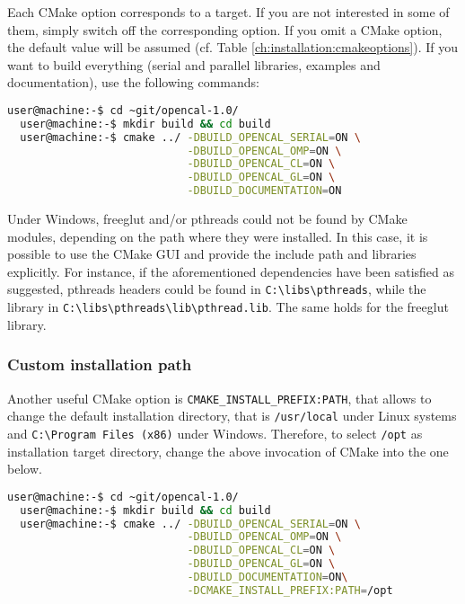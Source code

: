 Each CMake option corresponds to a target. If you are not interested
in some of them, simply switch off the corresponding option. If you
omit a CMake option, the default value will be assumed (cf. Table
\ref{ch:installation:cmakeoptions}). If you want to build everything
(serial and parallel libraries, examples and documentation), use the
following commands:

\begin{lstlisting}[numbers=none,language=bash,label={ch:quickstart:simplebuild}]
  user@machine:-$ cd ~git/opencal-1.0/
  user@machine:-$ mkdir build && cd build
  user@machine:-$ cmake ../ -DBUILD_OPENCAL_SERIAL=ON \
                            -DBUILD_OPENCAL_OMP=ON \
                            -DBUILD_OPENCAL_CL=ON \
                            -DBUILD_OPENCAL_GL=ON \
                            -DBUILD_DOCUMENTATION=ON
\end{lstlisting}


Under Windows, freeglut and/or pthreads could not be found by CMake
modules, depending on the path where they were installed. In this
case, it is possible to use the CMake GUI and provide the include path
and libraries explicitly. For instance, if the aforementioned
dependencies have been satisfied as suggested, pthreads headers could
be found in \verb'C:\libs\pthreads', while the library in
\verb'C:\libs\pthreads\lib\pthread.lib'. The same holds for the
freeglut library.

\subsubsection{Custom installation path}

Another useful CMake option is \texttt{CMAKE\_INSTALL\_PREFIX:PATH},
that allows to change the default installation directory, that is
\verb'/usr/local' under Linux systems and
\verb'C:\Program Files (x86)' under Windows. Therefore, to select
\texttt{/opt} as installation target directory, change the above
invocation of CMake into the one below.

\begin{lstlisting}[numbers=none,language=bash,label={ch:quickstart:simplebuild}]
  user@machine:-$ cd ~git/opencal-1.0/
  user@machine:-$ mkdir build && cd build
  user@machine:-$ cmake ../ -DBUILD_OPENCAL_SERIAL=ON \
                            -DBUILD_OPENCAL_OMP=ON \
                            -DBUILD_OPENCAL_CL=ON \
                            -DBUILD_OPENCAL_GL=ON \
                            -DBUILD_DOCUMENTATION=ON\
                            -DCMAKE_INSTALL_PREFIX:PATH=/opt
\end{lstlisting}


